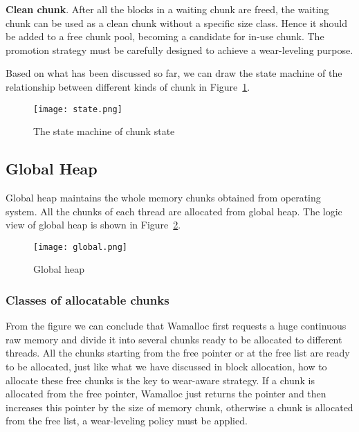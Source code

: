 \documentclass[10pt, conference, compsocconf]{IEEEtran}
\begin{document}
\textbf{Clean chunk}.
After all the blocks in a waiting chunk are freed, the waiting chunk can be used as a clean chunk without a specific size class.
Hence it should be added to a free chunk pool, becoming a candidate for in-use chunk.
The promotion strategy must be carefully designed to achieve a wear-leveling purpose.

Based on what has been discussed so far,
we can draw the state machine of the relationship between different kinds of chunk in Figure~\ref{fig:state}.

\begin{figure}[h]
\centering
\texttt{[image: state.png]}
\caption{The state machine of chunk state}
\label{fig:state}
\end{figure}

\subsection{Global Heap}

Global heap maintains the whole memory chunks obtained from operating system. 
All the chunks of each thread are allocated from global heap. 
The logic view of global heap is shown in Figure~\ref{fig:global}.

\begin{figure}[h]
\centering
\texttt{[image: global.png]}
\caption{Global heap }
\label{fig:global}
\end{figure}

\subsubsection{Classes of allocatable chunks}
From the figure we can conclude that Wamalloc first requests a huge continuous raw memory and divide it into several chunks ready to be allocated to different threads.
All the chunks starting from the free pointer or at the free list are ready to be allocated, 
just like what we have discussed in block allocation, how to allocate these free chunks is the key to wear-aware strategy.
If a chunk is allocated from the free pointer, Wamalloc just returns the pointer and then increases this pointer by the size of memory chunk, 
otherwise a chunk is allocated from the free list, a wear-leveling policy must be applied.
\end{document}
